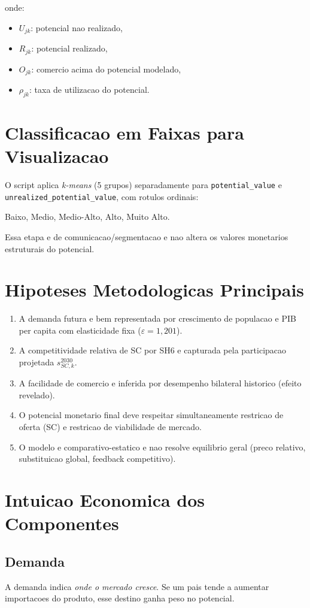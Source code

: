 \documentclass[12pt,a4paper]{article}
\begin{document}
onde:
\begin{itemize}
    \item $U_{jk}$: potencial nao realizado,
    \item $R_{jk}$: potencial realizado,
    \item $O_{jk}$: comercio acima do potencial modelado,
    \item $\rho_{jk}$: taxa de utilizacao do potencial.
\end{itemize}

\section{Classificacao em Faixas para Visualizacao}
O script aplica \textit{k-means} (5 grupos) separadamente para \texttt{potential\_value} e \texttt{unrealized\_potential\_value}, com rotulos ordinais:
\begin{center}
Baixo, Medio, Medio-Alto, Alto, Muito Alto.
\end{center}

Essa etapa e de comunicacao/segmentacao e nao altera os valores monetarios estruturais do potencial.

\section{Hipoteses Metodologicas Principais}
\begin{enumerate}
    \item A demanda futura e bem representada por crescimento de populacao e PIB per capita com elasticidade fixa ($\varepsilon=1{,}201$).
    \item A competitividade relativa de SC por SH6 e capturada pela participacao projetada $s_{SC,k}^{2030}$.
    \item A facilidade de comercio e inferida por desempenho bilateral historico (efeito revelado).
    \item O potencial monetario final deve respeitar simultaneamente restricao de oferta (SC) e restricao de viabilidade de mercado.
    \item O modelo e comparativo-estatico e nao resolve equilibrio geral (preco relativo, substituicao global, feedback competitivo).
\end{enumerate}

\section{Intuicao Economica dos Componentes}
\subsection{Demanda}
A demanda indica \textit{onde o mercado cresce}. Se um pais tende a aumentar importacoes do produto, esse destino ganha peso no potencial.
\end{document}
